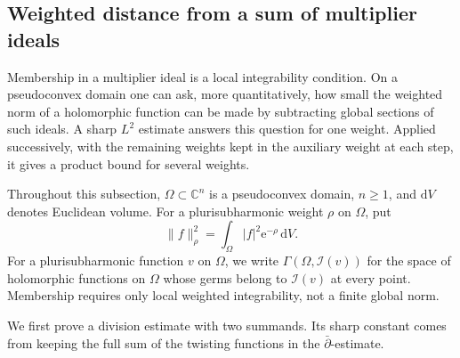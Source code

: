 \subsection{Weighted distance from a sum of multiplier ideals}
\label{subsec:psh-quantitative-ideals}

Membership in a multiplier ideal is a local integrability condition. On a pseudoconvex domain one can ask, more quantitatively, how small the weighted norm of a holomorphic function can be made by subtracting global sections of such ideals. A sharp $L^2$ estimate answers this question for one weight. Applied successively, with the remaining weights kept in the auxiliary weight at each step, it gives a product bound for several weights.

Throughout this subsection, $\Omega\subset\mathbb C^n$ is a pseudoconvex domain, $n\geq1$, and $\mathrm{d}V$ denotes Euclidean volume. For a plurisubharmonic weight $\rho$ on $\Omega$, put
\[
 \|f\|_\rho^2=\int_\Omega |f|^2\mathrm e^{-\rho}\,\mathrm{d}V.
\]
For a plurisubharmonic function $v$ on $\Omega$, we write $\Gamma(\Omega,\mathcal I(v))$ for the space of holomorphic functions on $\Omega$ whose germs belong to $\mathcal I(v)$ at every point. Membership requires only local weighted integrability, not a finite global norm.

We first prove a division estimate with two summands. Its sharp constant comes from keeping the full sum of the twisting functions in the $\bar\partial$-estimate.


